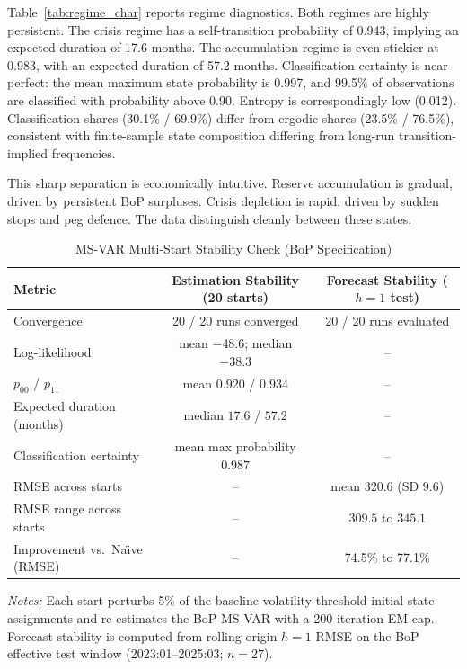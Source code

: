 \documentclass[12pt,a4paper]{article}
\begin{document}
Table~\ref{tab:regime_char} reports regime diagnostics. Both regimes are highly persistent. The crisis regime has a self-transition probability of 0.943, implying an expected duration of 17.6 months. The accumulation regime is even stickier at 0.983, with an expected duration of 57.2 months. Classification certainty is near-perfect: the mean maximum state probability is 0.997, and 99.5\% of observations are classified with probability above 0.90. Entropy is correspondingly low (0.012). Classification shares (30.1\% / 69.9\%) differ from ergodic shares (23.5\% / 76.5\%), consistent with finite-sample state composition differing from long-run transition-implied frequencies.

This sharp separation is economically intuitive. Reserve accumulation is gradual, driven by persistent BoP surpluses. Crisis depletion is rapid, driven by sudden stops and peg defence. The data distinguish cleanly between these states.

\begin{table}[htbp]
\centering
\caption{MS-VAR Multi-Start Stability Check (BoP Specification)}
\label{tab:multistart}
\begin{tabular}{lcc}
\toprule
Metric & Estimation Stability (20 starts) & Forecast Stability ($h=1$ test) \\
\midrule
Convergence & 20 / 20 runs converged & 20 / 20 runs evaluated \\
Log-likelihood & mean $-48.6$; median $-38.3$ & -- \\
$p_{00}$ / $p_{11}$ & mean $0.920$ / $0.934$ & -- \\
Expected duration (months) & median $17.6$ / $57.2$ & -- \\
Classification certainty & mean max probability $0.987$ & -- \\
RMSE across starts & -- & mean $320.6$ (SD $9.6$) \\
RMSE range across starts & -- & $309.5$ to $345.1$ \\
Improvement vs.\ Na\"{\i}ve (RMSE) & -- & 74.5\% to 77.1\% \\
\bottomrule
\end{tabular}
\begin{tablenotes}
\small
\item \textit{Notes:} Each start perturbs 5\% of the baseline volatility-threshold initial state assignments and re-estimates the BoP MS-VAR with a 200-iteration EM cap. Forecast stability is computed from rolling-origin $h=1$ RMSE on the BoP effective test window (2023:01--2025:03; $n=27$).
\end{tablenotes}
\end{table}
\end{document}
